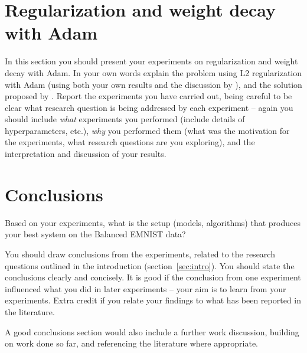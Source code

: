 \documentclass{article}
\begin{document}
\section{Regularization and weight decay with Adam}
In this section you should present your experiments on regularization and weight decay with Adam.  In your own words explain the problem using L2 regularization with Adam (using both your own results and the discussion by \citet{loshchilov2018fixing}), and the solution proposed by \citeauthor{loshchilov2018fixing}.  Report the experiments you have carried out, being careful to be clear what research question is being addressed by each experiment -- again you should include \emph{what} experiments you performed (include details of hyperparameters, etc.),  \emph{why} you performed them (what was the motivation for the experiments, what research questions are you exploring), and the interpretation and discussion of your results.



\section{Conclusions}
\label{sec:concl}
Based on your experiments, what is the setup (models, algorithms) that produces your best system on the Balanced EMNIST data?  

You should draw conclusions from the experiments, related to the research questions outlined in the introduction (section~\ref{sec:intro}). You should state the conclusions clearly and concisely. It is good if the conclusion from one experiment influenced what you did in later experiments -- your aim is to learn from your experiments. Extra credit if you relate your findings to what has been reported in the literature.

A good conclusions section would also include a further work discussion, building on work done so far, and referencing the literature where appropriate.


\end{document}
